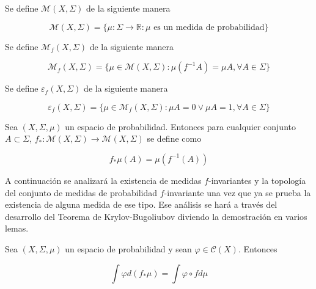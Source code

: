 \begin{definicion}
	Se define $\mathcal{M}(X,\Sigma)$ de la siguiente manera
	
	\begin{equation}
		\mathcal{M}(X,\Sigma) = \{\mu: \Sigma \rightarrow \mathbb{R}: \mu \text{ es un medida de probabilidad} \}
	\end{equation}
\end{definicion}

\begin{definicion}
	Se define $\mathcal{M}_f(X,\Sigma)$ de la siguiente manera
	
	\begin{equation}
		\mathcal{M}_f(X,\Sigma) = \{ \mu \in \mathcal{M}(X,\Sigma): \mu(f^{-1} A) = \mu A, \forall A \in \Sigma \}
	\end{equation}
\end{definicion}

\begin{definicion}
	Se define $\varepsilon_f(X,\Sigma)$ de la siguiente manera
	
	\begin{equation}
		\varepsilon_f(X,\Sigma) = \{ \mu \in \mathcal{M}_f(X,\Sigma): \mu A = 0 \vee \mu A = 1, \forall A \in \Sigma \}
	\end{equation}
\end{definicion}

\begin{definicion}
	Sea $(X,\Sigma,\mu)$ un espacio de probabilidad. Entonces para cualquier conjunto $A \subset \Sigma$, $f_*: \mathcal{M}(X,\Sigma) \rightarrow \mathcal{M}(X,\Sigma)$ se define como
	
	\begin{equation}
		f_*\mu(A) = \mu(f^{-1}(A))
	\end{equation}
\end{definicion}

A continuación se analizará la existencia de medidas $f$-invariantes y la topología del conjunto de medidas de probabilidad $f$-invariante una vez que ya se prueba la existencia de alguna medida de ese tipo. Ese análisis se hará a través del desarrollo del Teorema de Krylov-Bugoliubov diviendo la demostración en varios lemas.

\begin{lema}\label{lema1_krylov-bugoliubov}
	Sea $(X,\Sigma,\mu)$ un espacio de probabilidad y sean $\varphi \in \mathcal{C}(X)$. Entonces
	
	\begin{equation}
		\int \varphi d(f_*\mu)=\int \varphi \circ f d\mu
	\end{equation}
\end{lema}

